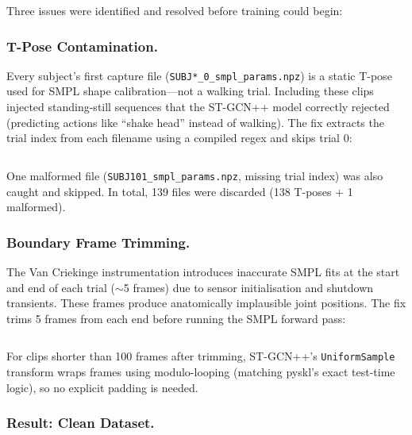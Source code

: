 \documentclass[9pt,a4paper,twocolumn,twoside]{tau-class/tau}
\begin{document}
Three issues were identified and resolved before training could begin:

\subsubsection{T-Pose Contamination.}

Every subject's first capture file (\texttt{SUBJ*\_0\_smpl\_params.npz}) is a static T-pose used for SMPL shape calibration---not a walking trial. Including these clips injected standing-still sequences that the ST-GCN++ model correctly rejected (predicting actions like ``shake head'' instead of walking). The fix extracts the trial index from each filename using a compiled regex and skips trial 0:

\begin{listing}[H]
\caption{Trial-index filter used to remove T-pose calibration files.}
\label{code:trial-filter}
\inputminted[fontsize=\footnotesize,breaklines,linenos]{python}{src/trial_filter.py}
\end{listing}

One malformed file (\texttt{SUBJ101\_smpl\_params.npz}, missing trial index) was also caught and skipped. In total, 139 files were discarded (138 T-poses + 1 malformed).

\subsubsection{Boundary Frame Trimming.}

The Van Criekinge instrumentation introduces inaccurate SMPL fits at the start and end of each trial ($\sim$5 frames) due to sensor initialisation and shutdown transients. These frames produce anatomically implausible joint positions. The fix trims 5 frames from each end before running the SMPL forward pass:

\begin{listing}[H]
\caption{Boundary-frame trimming before SMPL forward inference.}
\label{code:frame-trim}
\inputminted[fontsize=\footnotesize,breaklines,linenos]{python}{src/frame_trim.py}
\end{listing}

For clips shorter than 100 frames after trimming, ST-GCN++'s \texttt{UniformSample} transform wraps frames using modulo-looping (matching pyskl's exact test-time logic), so no explicit padding is needed.

\subsubsection{Result: Clean Dataset.}
\end{document}
